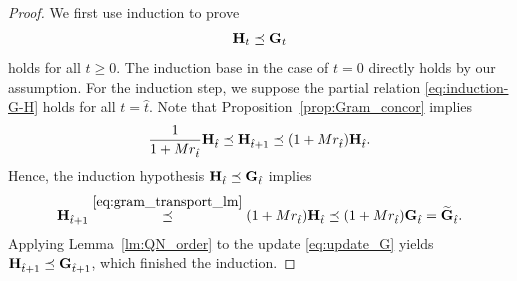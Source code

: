 \documentclass[11pt]{article}
\theoremstyle{plain}
\theoremstyle{definition}
\theoremstyle{remark}
\theoremstyle{plain}
\def\G{{\bf G}}
\def\H{{\bf H}}
\begin{document}
\begin{proof}
We first use induction to prove 
\begin{align}\label{eq:induction-G-H}
    \H_t\preceq\G_t
\end{align}
holds for all $t\geq 0$.
The induction base in the case of $t=0$ directly holds by our assumption.
For the induction step, we suppose the partial relation \eqref{eq:induction-G-H} holds for all $t=\hat t$. 
Note that Proposition~\ref{prop:Gram_concor} implies
\begin{align}
\label{eq:gram_transport_lm}
\frac{1}{1+Mr_{\hat t}}\H_{\hat t}
\preceq \H_{{\hat t}+1}
\preceq(1+Mr_{\hat t})\H_{\hat t}.
\end{align}
Hence, the induction hypothesis $\H_{\hat t}\preceq\G_{\hat t}$ implies
\begin{align*}
\H_{{\hat t}+1}\overset{\eqref{eq:gram_transport_lm}}\preceq(1+Mr_{\hat t})\H_{\hat t}
\preceq(1+Mr_{\hat t})\G_{\hat t}=\widetilde{\G}_{\hat t}.
\end{align*}
Applying Lemma~\ref{lm:QN_order} to the update \eqref{eq:update_G}  yields $\H_{\hat t+1}\preceq\G_{\hat t+1}$, which finished the induction.


\end{proof}
\end{document}
